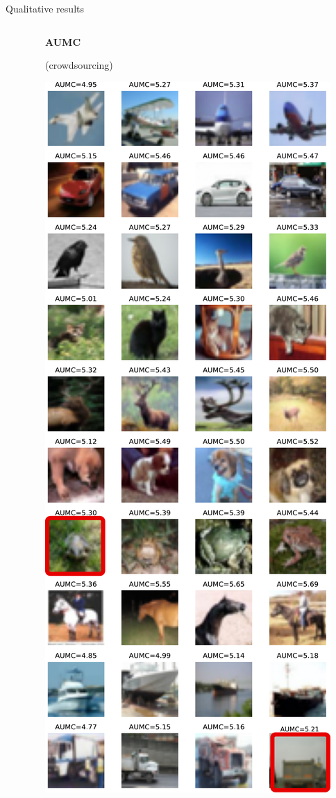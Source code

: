 \begin{frame}{Qualitative results}{}
\begin{columns}
\begin{column}{.3\textwidth}
        \end{column}

        \begin{column}{.3\textwidth}
            \textbf{AUMC}

            (crowdsourcing)

            \vspace{.25cm}

            \centering
               \includegraphics[width=\textwidth, clip, trim={0cm 0cm 0cm 12cm}]{../chapters/images/AUMC_yang_cut.pdf}

\end{column}
\end{columns}
\end{frame}
